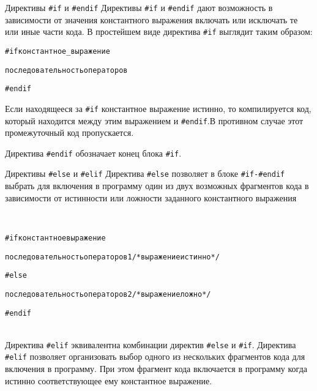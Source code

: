 \documentclass{beamer}
\begin{document}
\begin{frame}{Директивы \texttt{#if} и \texttt{#endif}}
    Директивы \texttt{\#if} и \texttt{\#endif} дают возможность в зависимости от значения константного выражения включать или исключать те или иные части кода. В простейшем виде директива \texttt{\#if} выглядит таким образом:
    
    \begin{alltt}
        \#if константное\_выражение
        
        \qquad последовательность операторов
        
        \#endif
    \end{alltt}
    
    Если находящееся за \texttt{\#if} константное выражение истинно, то компилируется код, который находится между этим выражением и \texttt{\#endif}.В противном случае этот промежуточный код пропускается.
    
    Директива \texttt{\#endif} обозначает конец блока \texttt{\#if}.
\end{frame}

\begin{frame}{Директивы \texttt{\#else} и \texttt{\#elif}}
    Директива \texttt{\#else} позволяет в блоке \texttt{\#if-\#endif} выбрать для включения в программу один из двух возможных фрагментов кода в зависимости от истинности или ложности заданного константного выражения
    
    \\
    \begin{alltt}
        \#if константное выражение
        
        \qquad последовательность операторов 1 /* выражение истинно */
        
        \#else
        
        \qquad последовательность операторов 2 /* выражение ложно */
        
        \#endif
    \end{alltt}
    
    \\
    Директива \texttt{\#elif} эквивалентна комбинации директив \texttt{\#else} и \texttt{\#if}. Директива \texttt{\#elif} позволяет организовать выбор одного из нескольких фрагментов кода для включения в программу. При этом фрагмент кода включается в программу когда истинно соответствующее ему константное выражение.
\end{frame}
\end{document}
